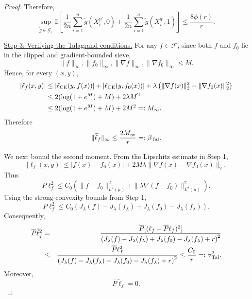 \documentclass[11pt]{article}
\theoremstyle{plain}
\theoremstyle{definition}
\theoremstyle{remark}
\newcommand{\proofstep}[1]{\par\medskip\noindent\uline{#1}}
\begin{document}
\begin{proof}
Therefore,
\begin{equation}
\label{eq:shifted-expectation-bound}
\sup_{\widetilde g\in\widetilde{\mathcal G}_r}
\mathbb E
\left[
\frac1{2n}\sum_{i=1}^{n}
\widetilde g(X_i^{p\prime},0)
+
\frac1{2n}\sum_{i=1}^{n}
\widetilde g(X_i^{q\prime},1)
\right]
\le
\frac{8\phi(r)}{r}.
\end{equation}


\proofstep{Step 3: Verifying the Talagrand conditions.}
For any \(f\in\mathcal F\), since both \(f\) and \(f_0\) lie in the clipped
and gradient-bounded sieve,
\[
\|f\|_\infty,\|f_0\|_\infty,
\|\nabla f\|_\infty,\|\nabla f_0\|_\infty
\le M.
\]
Hence, for every \((x,y)\),
\[
\begin{aligned}
|\ell_f(x,y)|
&\le
|\ell_{\rm CE}(y,f(x))|
+
|\ell_{\rm CE}(y,f_0(x))|
+
\lambda
\left(
\|\nabla f(x)\|_2^2+\|\nabla f_0(x)\|_2^2
\right)\\
&\le
2(\log(1+e^M)+M)+2\lambda M^2\\
&\le
2(\log(1+e^M)+M)+2M^2
=:M_\infty.
\end{aligned}
\]
Therefore
\begin{equation}
\label{eq:shifted-infty-bound}
\|\widetilde{\ell}_f\|_\infty
\le
\frac{2M_\infty}{r}
=:\beta_{\rm Tal}.
\end{equation}

We next bound the second moment. From the Lipschitz estimate in Step 1,
\[
|\ell_f(x,y)|
\le
|f(x)-f_0(x)|
+
2M\lambda
\|\nabla f(x)-\nabla f_0(x)\|_2.
\]
Thus
\[
\overline P\ell_f^2
\le
C_0
\left(
\|f-f_0\|_{L^2(\mu)}^2
+
\|\lambda\nabla(f-f_0)\|_{L^2(\mu)}^2
\right).
\]
Using the strong-convexity bounds from Step 1,
\[
\overline P\ell_f^2
\le
C_0
\left(
J_\lambda(f)-J_\lambda(f_\lambda)
+
J_\lambda(f_0)-J_\lambda(f_\lambda)
\right).
\]
Consequently,
\begin{eqnarray*}
    \overline P\widetilde{\ell}_f^2
&=&
\frac{\overline P[(\ell_f-\overline P\ell_f)^2]}
{\left(
J_\lambda(f)-J_\lambda(f_\lambda)
+
J_\lambda(f_0)-J_\lambda(f_\lambda)+r
\right)^2}\\
&\le&
\frac{\overline P\ell_f^2}
{\left(
J_\lambda(f)-J_\lambda(f_\lambda)
+
J_\lambda(f_0)-J_\lambda(f_\lambda)+r
\right)^2}
\le
\frac{C_0}{r}
=:\sigma_{\rm Tal}^2.
\end{eqnarray*}
Moreover,
\[
\overline P\widetilde{\ell}_f=0.
\]


\end{proof}
\end{document}
